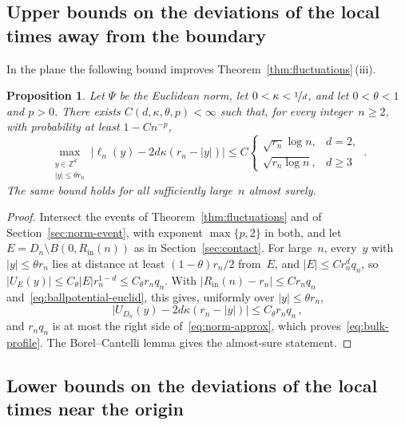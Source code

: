 \documentclass[11pt]{amsart}
\theoremstyle{plain}
\newtheorem{proposition}[theorem]{Proposition}
\theoremstyle{definition}
\newcommand{\Z}{\mathbb Z}
\newcommand{\drift}{\kappa}
\newcommand{\gauge}{\Psi}
\newcommand{\nf}{\nicefrac}
\newcommand{\Rin}{R_{\mathrm{in}}}
\numberwithin{equation}{section}
\begin{document}
\subsection{Upper bounds on the deviations of the local times away from the boundary}

In the plane the following bound improves Theorem~\ref{thm:fluctuations}\,(iii).

\begin{proposition}\label{prop:bulk-profile}
Let $\gauge$ be the Euclidean norm, let $0<\drift<\nf1d$, and let $0<\theta<1$ and $p>0$. There exists $C(d,\drift,\theta,p)<\infty$ such that, for every integer~$n\geq2$, with probability at least $1-Cn^{-p}$,
\begin{equation}\label{eq:bulk-profile}
\max_{\substack{y\in\Z^d\\|y|\leq\theta r_n}}\bigl|\ell_n(y)-2d\drift(r_n-|y|)\bigr|
\leq C\begin{cases}\sqrt{r_n}\log n,&d=2,\\\sqrt{r_n\log n},&d\geq3\end{cases}\, .
\end{equation}
The same bound holds for all sufficiently large~$n$ almost surely.
\end{proposition}

\begin{proof}
Intersect the events of Theorem~\ref{thm:fluctuations} and of Section~\ref{sec:norm-event}, with exponent $\max\{p,2\}$ in both, and let $E=D_n\setminus B(0,\Rin(n))$ as in Section~\ref{sec:contact}. For large~$n$, every~$y$ with $|y|\leq\theta r_n$ lies at distance at least $(1-\theta)r_n/2$ from~$E$, and $|E|\leq Cr_n^dq_n$, so $|U_E(y)|\leq C_\theta|E|r_n^{1-d}\leq C_\theta r_nq_n$. With $|\Rin(n)-r_n|\leq Cr_nq_n$ and~\eqref{eq:ballpotential-euclid}, this gives, uniformly over $|y|\leq\theta r_n$,
\begin{equation}\label{eq:bulk-potential-only}
\bigl|U_{D_n}(y)-2d\drift(r_n-|y|)\bigr|\leq C_\theta r_nq_n\, ,
\end{equation}
and $r_nq_n$ is at most the right side of~\eqref{eq:norm-approx}, which proves~\eqref{eq:bulk-profile}. The Borel--Cantelli lemma gives the almost-sure statement.
\end{proof}

\subsection{Lower bounds on the deviations of the local times near the origin}\label{sec:sharp-bulk}
\end{document}
